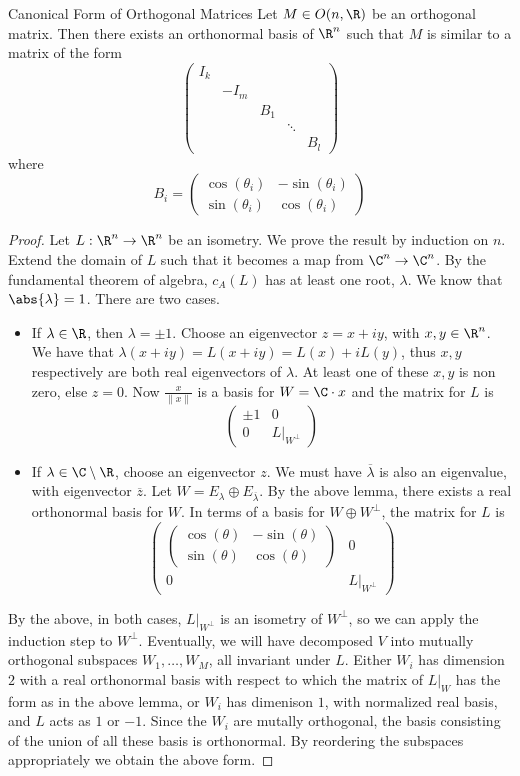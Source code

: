 \documentclass[a4paper]{article}
\begin{document}
\begin{thm}{Canonical Form of Orthogonal Matrices}{} Let $M\in O(n,\R)$ be an orthogonal matrix. Then there exists an orthonormal basis of $\R^n$ such that $M$ is similar to a matrix of the form $$\begin{pmatrix}
I_k &&&&\\
&-I_m&&&\\
&&B_1&&\\
&&&\ddots&\\
&&&&B_l
\end{pmatrix}$$ where $$B_i=\begin{pmatrix}\cos(\theta_i) & -\sin(\theta_i) \\
\sin(\theta_i) & \cos(\theta_i)
\end{pmatrix}$$
\begin{proof}
Let $L:\R^n\to\R^n$ be an isometry. We prove the result by induction on $n$. Extend the domain of $L$ such that it becomes a map from $\C^n\to\C^n$. By the fundamental theorem of algebra, $c_A(L)$ has at least one root, $\lambda$. We know that $\abs{\lambda}=1$. There are two cases. 
\begin{itemize}
\item If $\lambda\in\R$, then $\lambda=\pm1$. Choose an eigenvector $z=x+iy$, with $x,y\in\R^n$. We have that $\lambda(x+iy)=L(x+iy)=L(x)+iL(y)$, thus $x,y$ respectively are both real eigenvectors of $\lambda$. At least one of these $x,y$ is non zero, else $z=0$. Now $\frac{x}{\|x\|}$ is a basis for $W=\C\cdot x$ and the matrix for $L$ is $$\begin{pmatrix}
\pm1 & 0\\
0 & L|_{W^\perp}
\end{pmatrix}$$
\item If $\lambda\in\C\setminus\R$, choose an eigenvector $z$. We must have $\overline{\lambda}$ is also an eigenvalue, with eigenvector $\overline{z}$. Let $W=E_{\lambda}\oplus E_{\overline{\lambda}}$. By the above lemma, there exists a real orthonormal basis for $W$. In terms of a basis for $W\oplus W^\perp$, the matrix for $L$ is $$\begin{pmatrix}
\begin{pmatrix}
\cos(\theta) & -\sin(\theta) \\
\sin(\theta) & \cos(\theta)
\end{pmatrix} & 0\\
0 & L|_{W^\perp}
\end{pmatrix}$$
\end{itemize}
By the above, in both cases, $L|_{W^\perp}$ is an isometry of $W^\perp$, so we can apply the induction step to $W^\perp$. Eventually, we will have decomposed $V$ into mutually orthogonal subspaces $W_1,\dots,W_M$, all invariant under $L$. Either $W_i$ has dimension $2$ with a real orthonormal basis with respect to which the matrix of $L|_W$ has the form as in the above lemma, or $W_i$ has dimenison $1$, with normalized real basis, and $L$ acts as $1$ or $-1$. Since the $W_i$ are mutally orthogonal, the basis consisting of the union of all these basis is orthonormal. By reordering the subspaces appropriately we obtain the above form. 
\end{proof}
\end{thm}
\end{document}
